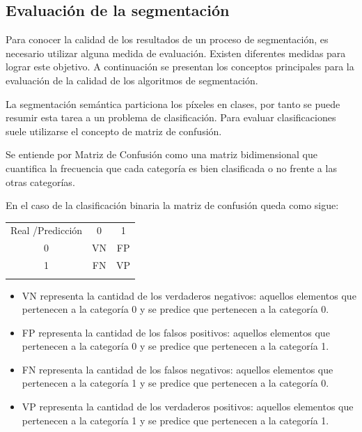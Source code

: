 \subsection{Evaluación de la segmentación}

Para conocer la calidad de los resultados de un proceso de segmentación, es necesario utilizar alguna medida de evaluación. Existen diferentes medidas para lograr este objetivo. A continuación se presentan los conceptos principales para la evaluación de la calidad de los algoritmos de segmentación.

La segmentación semántica particiona los píxeles en clases, por tanto se puede resumir esta tarea a un problema de clasificación. Para evaluar clasificaciones suele utilizarse el concepto de matriz de confusión.

\begin{definition}
	Se entiende por Matriz de Confusión como una matriz bidimensional que cuantifica la frecuencia que cada categoría es bien clasificada o no frente a las otras categorías.
\end{definition}

En el caso de la clasificación binaria la matriz de confusión queda como sigue:

\begin{table}[ht]
	\centering
	\begin{tabular}{|| c || c | c ||}
		\hhline{|=||=|=|}
		
		Real /Predicción & 0 & 1\\ \hhline{||=||=|=||}
		0 & VN & FP\\
		1 & FN & VP \\ \hhline{|=||=|=|}
	\end{tabular}
\end{table}

\begin{itemize}
	\item VN representa la cantidad  de los verdaderos negativos: aquellos elementos que pertenecen a la categoría 0 y se predice que pertenecen a la categoría 0.
	\item FP representa la cantidad  de  los falsos positivos: aquellos elementos que pertenecen a la categoría 0 y se predice que pertenecen a la categoría 1.
	\item FN representa la cantidad  de  los falsos negativos: aquellos elementos que pertenecen a la categoría 1 y se predice que pertenecen a la categoría 0.
	\item VP representa la cantidad  de  los verdaderos positivos: aquellos elementos que pertenecen a la categoría 1 y se predice que pertenecen a la categoría 1.
\end{itemize}

